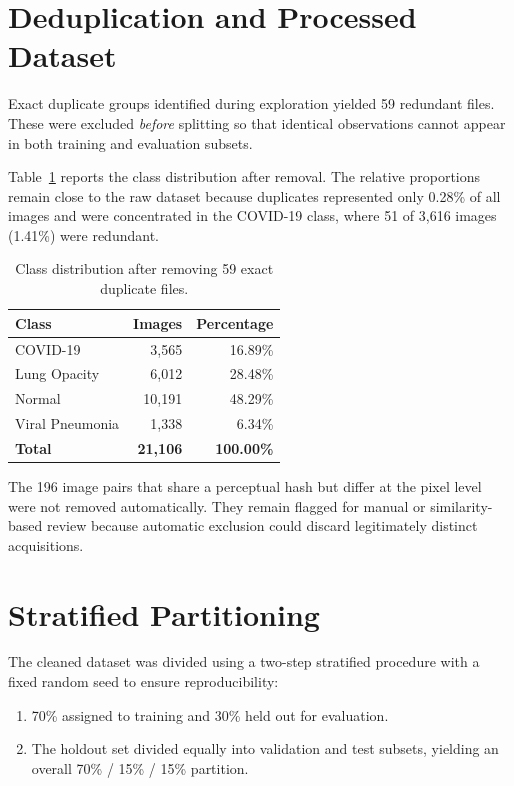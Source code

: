 \section{Deduplication and Processed Dataset}

Exact duplicate groups identified during exploration yielded 59 redundant files.
These were excluded \emph{before} splitting so that identical observations cannot
appear in both training and evaluation subsets.

Table~\ref{tab:post_dedup_counts} reports the class distribution after removal.
The relative proportions remain close to the raw dataset because duplicates
represented only 0.28\% of all images and were concentrated in the COVID-19 class,
where 51 of 3{,}616 images (1.41\%) were redundant.

\begin{table}[H]
\centering
\caption{Class distribution after removing 59 exact duplicate files.}
\label{tab:post_dedup_counts}
\begin{tabular}{lrr}
\toprule
\textbf{Class} & \textbf{Images} & \textbf{Percentage} \\
\midrule
COVID-19       & 3{,}565 & 16.89\% \\
Lung Opacity   & 6{,}012 & 28.48\% \\
Normal         & 10{,}191 & 48.29\% \\
Viral Pneumonia & 1{,}338 & 6.34\% \\
\midrule
\textbf{Total} & \textbf{21{,}106} & \textbf{100.00\%} \\
\bottomrule
\end{tabular}
\end{table}

The 196 image pairs that share a perceptual hash but differ at the pixel level
were not removed automatically. They remain flagged for manual or similarity-based
review because automatic exclusion could discard legitimately distinct acquisitions.

\section{Stratified Partitioning}

The cleaned dataset was divided using a two-step stratified procedure with a
fixed random seed to ensure reproducibility:

\begin{enumerate}
    \item 70\% assigned to training and 30\% held out for evaluation.
    \item The holdout set divided equally into validation and test subsets,
    yielding an overall 70\% / 15\% / 15\% partition.
\end{enumerate}

